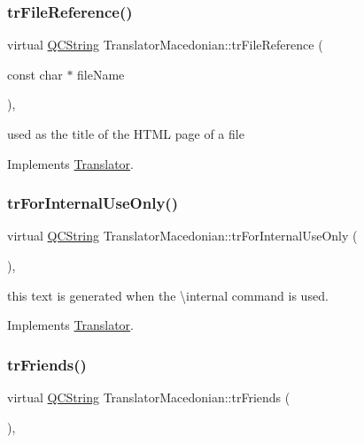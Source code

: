 \subsubsection{\texorpdfstring{trFileReference()}{trFileReference()}}
{\footnotesize\ttfamily virtual \mbox{\hyperlink{class_q_c_string}{Q\+C\+String}} Translator\+Macedonian\+::tr\+File\+Reference (\begin{DoxyParamCaption}\item[{const char $\ast$}]{file\+Name }\end{DoxyParamCaption})\hspace{0.3cm}{\ttfamily [inline]}, {\ttfamily [virtual]}}

used as the title of the H\+T\+ML page of a file 

Implements \mbox{\hyperlink{class_translator}{Translator}}.

\mbox{\label{class_translator_macedonian_af041dc1d7fe3d789b0a5c5b9c0c75958}} 
\subsubsection{\texorpdfstring{trForInternalUseOnly()}{trForInternalUseOnly()}}
{\footnotesize\ttfamily virtual \mbox{\hyperlink{class_q_c_string}{Q\+C\+String}} Translator\+Macedonian\+::tr\+For\+Internal\+Use\+Only (\begin{DoxyParamCaption}{ }\end{DoxyParamCaption})\hspace{0.3cm}{\ttfamily [inline]}, {\ttfamily [virtual]}}

this text is generated when the \textbackslash{}internal command is used. 

Implements \mbox{\hyperlink{class_translator}{Translator}}.

\mbox{\label{class_translator_macedonian_a5c0ffa2acf7fb2aa82a43839d0922f09}} 
\subsubsection{\texorpdfstring{trFriends()}{trFriends()}}
{\footnotesize\ttfamily virtual \mbox{\hyperlink{class_q_c_string}{Q\+C\+String}} Translator\+Macedonian\+::tr\+Friends (\begin{DoxyParamCaption}{ }\end{DoxyParamCaption})\hspace{0.3cm}{\ttfamily [inline]}, {\ttfamily [virtual]}}

